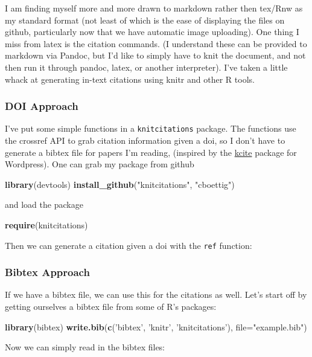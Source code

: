 \documentclass[]{article}
\newenvironment{Shaded}{}{}
\newcommand{\KeywordTok}[1]{\textcolor[rgb]{0.00,0.44,0.13}{\textbf{{#1}}}}
\newcommand{\DataTypeTok}[1]{\textcolor[rgb]{0.56,0.13,0.00}{{#1}}}
\newcommand{\StringTok}[1]{\textcolor[rgb]{0.25,0.44,0.63}{{#1}}}
\newcommand{\NormalTok}[1]{{#1}}
\begin{document}
I am finding myself more and more drawn to markdown rather then tex/Rnw
as my standard format (not least of which is the ease of displaying the
files on github, particularly now that we have automatic image
uploading). One thing I miss from latex is the citation commands. (I
understand these can be provided to markdown via Pandoc, but I'd like to
simply have to knit the document, and not then run it through pandoc,
latex, or another interpreter). I've taken a little whack at generating
in-text citations using knitr and other R tools.

\subsubsection{DOI Approach}

I've put some simple functions in a \texttt{knitcitations} package. The
functions use the crossref API to grab citation information given a doi,
so I don't have to generate a bibtex file for papers I'm reading,
(inspired by the
\href{http://wordpress.org/extend/plugins/kcite/}{kcite} package for
Wordpress). One can grab my package from github

\begin{Shaded}
\begin{Highlighting}[]
\KeywordTok{library}\NormalTok{(devtools)}
\KeywordTok{install_github}\NormalTok{(}\StringTok{"knitcitations"}\NormalTok{, }\StringTok{"cboettig"}\NormalTok{)}
\end{Highlighting}
\end{Shaded}
and load the package

\begin{Shaded}
\begin{Highlighting}[]
\KeywordTok{require}\NormalTok{(knitcitations)}
\end{Highlighting}
\end{Shaded}
Then we can generate a citation given a doi with the \texttt{ref}
function:

\subsubsection{Bibtex Approach}

If we have a bibtex file, we can use this for the citations as well.
Let's start off by getting ourselves a bibtex file from some of R's
packages:

\begin{Shaded}
\begin{Highlighting}[]
\KeywordTok{library}\NormalTok{(bibtex)}
\KeywordTok{write.bib}\NormalTok{(}\KeywordTok{c}\NormalTok{(}\StringTok{'bibtex'}\NormalTok{, }\StringTok{'knitr'}\NormalTok{, }\StringTok{'knitcitations'}\NormalTok{), }\DataTypeTok{file=}\StringTok{"example.bib"}\NormalTok{)}
\end{Highlighting}
\end{Shaded}
Now we can simply read in the bibtex files:
\end{document}
